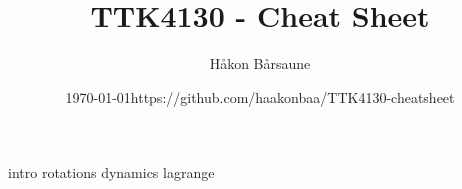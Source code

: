 \documentclass{article}
\title{TTK4130 - Cheat Sheet}
\author{Håkon Bårsaune}
\date{\centering\today\endgraf\bigskip https://github.com/haakonbaa/TTK4130-cheatsheet}
\begin{document}
\maketitle

\tableofcontents

\newpage

\begin{multicols}{2}
{intro} \newpage
{rotations}
{dynamics}
{lagrange}
\end{multicols}
\end{document}
